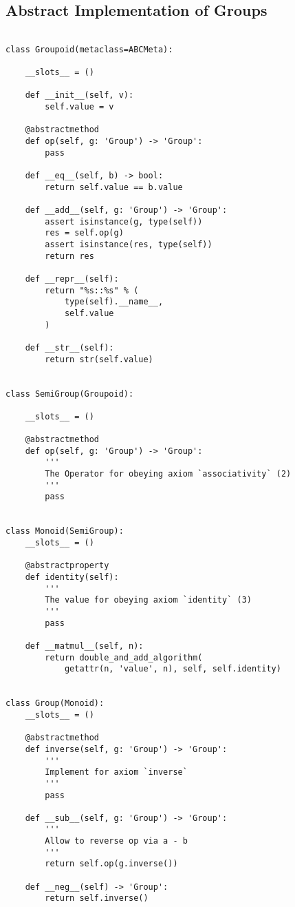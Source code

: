 \documentclass{article}
\begin{document}
\subsection{Abstract Implementation of Groups}
\begin{lstlisting}[title=abstract.py]

class Groupoid(metaclass=ABCMeta):

    __slots__ = ()

    def __init__(self, v):
        self.value = v

    @abstractmethod
    def op(self, g: 'Group') -> 'Group':
        pass

    def __eq__(self, b) -> bool:
        return self.value == b.value

    def __add__(self, g: 'Group') -> 'Group':
        assert isinstance(g, type(self))
        res = self.op(g)
        assert isinstance(res, type(self))
        return res

    def __repr__(self):
        return "%s::%s" % (
            type(self).__name__,
            self.value
        )

    def __str__(self):
        return str(self.value)


class SemiGroup(Groupoid):

    __slots__ = ()

    @abstractmethod
    def op(self, g: 'Group') -> 'Group':
        '''
        The Operator for obeying axiom `associativity` (2)
        '''
        pass


class Monoid(SemiGroup):
    __slots__ = ()

    @abstractproperty
    def identity(self):
        '''
        The value for obeying axiom `identity` (3)
        '''
        pass

    def __matmul__(self, n):
        return double_and_add_algorithm(
            getattr(n, 'value', n), self, self.identity)


class Group(Monoid):
    __slots__ = ()

    @abstractmethod
    def inverse(self, g: 'Group') -> 'Group':
        '''
        Implement for axiom `inverse`
        '''
        pass

    def __sub__(self, g: 'Group') -> 'Group':
        '''
        Allow to reverse op via a - b
        '''
        return self.op(g.inverse())

    def __neg__(self) -> 'Group':
        return self.inverse()
\end{lstlisting}
\end{document}
